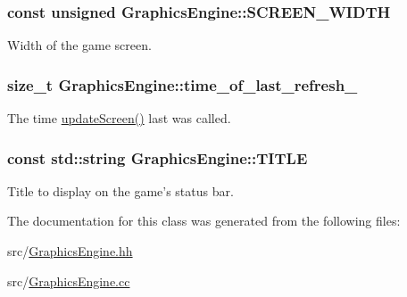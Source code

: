 \hypertarget{classGraphicsEngine_ac243d365dcf3e8a14f8ff1a838479429}{
\subsubsection[{S\-C\-R\-E\-E\-N\-\_\-\-W\-I\-D\-T\-H}]{\setlength{\rightskip}{0pt plus 5cm}const unsigned Graphics\-Engine\-::\-S\-C\-R\-E\-E\-N\-\_\-\-W\-I\-D\-T\-H\hspace{0.3cm}{\ttfamily [private]}}}\label{classGraphicsEngine_ac243d365dcf3e8a14f8ff1a838479429}


Width of the game screen. 

\hypertarget{classGraphicsEngine_a03732739efdf1f24a3bda1a202b6b866}{
\subsubsection[{time\-\_\-of\-\_\-last\-\_\-refresh\-\_\-}]{\setlength{\rightskip}{0pt plus 5cm}size\-\_\-t Graphics\-Engine\-::time\-\_\-of\-\_\-last\-\_\-refresh\-\_\-\hspace{0.3cm}{\ttfamily [private]}}}\label{classGraphicsEngine_a03732739efdf1f24a3bda1a202b6b866}


The time \hyperlink{classGraphicsEngine_aeadd04c5518ef05b039241cbb7d09b59}{update\-Screen()} last was called. 

\hypertarget{classGraphicsEngine_afc40023b292929b8b8e53c58b7e8f574}{
\subsubsection[{T\-I\-T\-L\-E}]{\setlength{\rightskip}{0pt plus 5cm}const std\-::string Graphics\-Engine\-::\-T\-I\-T\-L\-E\hspace{0.3cm}{\ttfamily [private]}}}\label{classGraphicsEngine_afc40023b292929b8b8e53c58b7e8f574}


Title to display on the game's status bar. 



The documentation for this class was generated from the following files\-:\begin{DoxyCompactItemize}
\item 
src/\hyperlink{GraphicsEngine_8hh}{Graphics\-Engine.\-hh}\item 
src/\hyperlink{GraphicsEngine_8cc}{Graphics\-Engine.\-cc}\end{DoxyCompactItemize}
